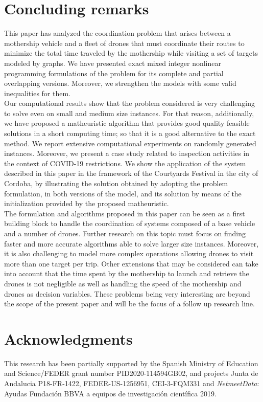 \documentclass[10pt,a4paper]{elsarticle}
\newcommand{\EN}[1]{{\color{black}#1}}
\begin{document}
\section{Concluding remarks\label{section:CR}}
\noindent
This paper has analyzed the coordination problem that arises between a mothership vehicle and a fleet of drones that must coordinate their routes to minimize the total time traveled by the mothership while visiting a set of targets modeled by graphs. We have presented exact mixed integer nonlinear programming formulations of the problem for its complete and partial overlapping versions. Moreover, we strengthen the models with some valid inequalities for them.\\
Our computational results show that the \EN{problem considered} is very challenging to solve even on small and medium size instances. For that reason, additionally, we have proposed a matheuristic algorithm that provides good quality feasible solutions in a short computing time; so that it is a good alternative to the exact method. We report extensive computational experiments on randomly generated instances. Moreover, we present a case study related to inspection activities in the context of COVID-19 restrictions. We show the application of the system described in this paper in the framework of the Courtyard\EN{s} Festival in the city of Cordoba, by illustrating the solution obtained by adopting the problem formulation, in both versions of the model, and its solution by means of the initialization provided by the proposed matheuristic.\\
\noindent
The formulation and algorithms proposed in this paper can be seen as a first building block to handle the coordination of systems composed \EN{of} a base vehicle and a number of  drones. Further research \EN{on} this topic must focus on finding faster and more accurate algorithms able to solve larger size instances. Moreover, it is also challenging to model more complex operations allowing \EN{drones to visit} more than one target per trip. Other extensions that may be considered can take into account that the time spent by the mothership to launch and retrieve the drones is not negligible as well as handling the speed of the mothership and drones as decision variables. These problems being very interesting are beyond the scope of the present paper and will be the focus of a follow up research line.
\section*{Acknowledgments}
This research has been partially supported by \EN{the} Spanish Ministry of Education and Science/FEDER grant number  PID2020-114594GB02, and projects Junta de Andalucia P18-FR-1422, FEDER-US-1256951, CEI-3-FQM331 and  \textit{NetmeetData}: Ayudas Fundaci\'on BBVA a equipos de investigaci\'on cient\'ifica 2019.
\end{document}
